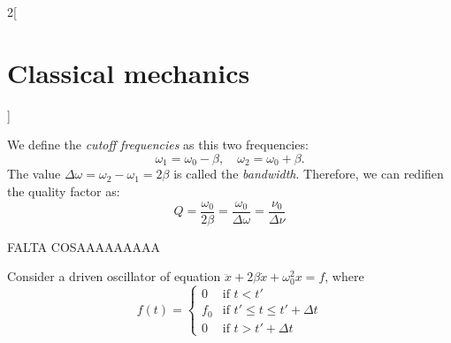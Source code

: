 \documentclass[class=article,10pt,crop=false]{standalone}
\begin{document}
\begin{multicols}{2}[\section{Classical mechanics}]
\begin{concept}
\end{concept}
\begin{definition}
We define the \textit{cutoff frequencies} as this two frequencies: $$\omega_1=\omega_0-\beta,\quad\omega_2=\omega_0+\beta.$$ The value $\Delta\omega=\omega_2-\omega_1=2\beta$ is called the \textit{bandwidth}. Therefore, we can redifien the quality factor as: $$Q=\frac{\omega_0}{2\beta}=\frac{\omega_0}{\Delta\omega}=\frac{\nu_0}{\Delta\nu}$$
\end{definition}
FALTA COSAAAAAAAAA
\begin{concept}
Consider a driven oscillator of equation $\ddot{x}+2\beta\dot{x}+\omega_0^2x=f$, where $$f(t)=\left\{\begin{array}{cc}
    0 & \text{if } t<t'\\
    f_0 & \text{if }t'\leq t\leq t'+\Delta t \\
    0 & \text{if } t>t'+\Delta t
\end{array}\right.$$
\end{concept}
\end{multicols}
\end{document}
